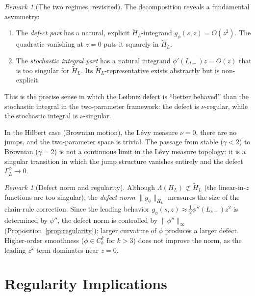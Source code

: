 \documentclass[11pt,a4paper]{article}
\theoremstyle{plain}
\theoremstyle{definition}
\theoremstyle{remark}
\newtheorem{remark}[theorem]{Remark}
\begin{document}
\begin{remark}[The two regimes, revisited]
\label{rem:regimes-revisited}
The decomposition reveals a fundamental asymmetry:
\begin{enumerate}[label=(\roman*)]
\item The \emph{defect part} has a natural, explicit
  $\widetilde{H}_L$-integrand $g_\phi(s,z) = O(z^2)$.
  The quadratic vanishing at $z = 0$ puts it squarely
  in $\widetilde{H}_L$.
\item The \emph{stochastic integral part} has a
  natural integrand $\phi'(L_{t-})z = O(z)$ that is
  too singular for $\widetilde{H}_L$.  Its
  $\widetilde{H}_L$-representative exists abstractly
  but is non-explicit.
\end{enumerate}
This is the precise sense in which the Leibniz defect
is ``better behaved'' than the stochastic integral in
the two-parameter framework: the defect is $\nu$-regular,
while the stochastic integral is $\nu$-singular.

In the Hilbert case (Brownian motion), the L\'evy measure
$\nu = 0$, there are no jumps, and the two-parameter
space is trivial.  The passage from stable ($\gamma < 2$)
to Brownian ($\gamma = 2$) is not a continuous limit
in the L\'evy measure topology: it is a singular transition
in which the jump structure vanishes entirely and the
defect $\Gamma_L^\phi \to 0$.
\end{remark}

\begin{remark}[Defect norm and regularity]
\label{rem:distance}
Although $\Lambda(H_L) \not\subset \widetilde{H}_L$
(the linear-in-$z$ functions are too singular), the
\emph{defect norm}
$\|g_\phi\|_{\widetilde{H}_L}$ measures
the size of the chain-rule correction.
Since the leading behavior $g_\phi(s,z) \approx
\tfrac{1}{2}\phi''(L_{s-})z^2$ is determined by
$\phi''$, the defect norm is controlled by
$\|\phi''\|_\infty$ (Proposition~\ref{prop:regularity}):
larger curvature of $\phi$ produces a larger defect.
Higher-order smoothness ($\phi \in C_b^k$ for $k > 3$)
does not improve the norm, as the leading $z^2$ term
dominates near $z = 0$.
\end{remark}


\section{Regularity Implications}\label{sec:regularity}
\end{document}
